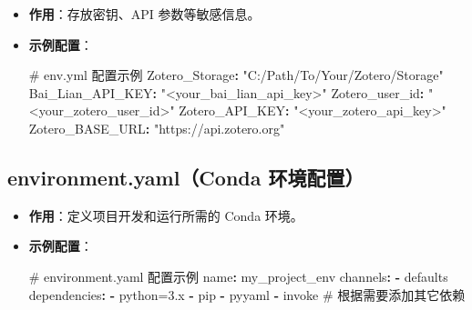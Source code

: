 \documentclass[
  letterpaper,
  DIV=11,
  numbers=noendperiod]{scrreprt}
\newenvironment{Shaded}{\begin{snugshade}}{\end{snugshade}}
\newcommand{\AttributeTok}[1]{\textcolor[rgb]{0.40,0.45,0.13}{#1}}
\newcommand{\CommentTok}[1]{\textcolor[rgb]{0.37,0.37,0.37}{#1}}
\newcommand{\FunctionTok}[1]{\textcolor[rgb]{0.28,0.35,0.67}{#1}}
\newcommand{\KeywordTok}[1]{\textcolor[rgb]{0.00,0.23,0.31}{\textbf{#1}}}
\newcommand{\StringTok}[1]{\textcolor[rgb]{0.13,0.47,0.30}{#1}}
\begin{document}
\begin{itemize}
\item
  \textbf{作用}：存放密钥、API 参数等敏感信息。\\
\item
  \textbf{示例配置}：

\begin{Shaded}
\begin{Highlighting}[]
\CommentTok{\# env.yml 配置示例}
\FunctionTok{Zotero\_Storage}\KeywordTok{:}\AttributeTok{ }\StringTok{"C:/Path/To/Your/Zotero/Storage"}
\FunctionTok{Bai\_Lian\_API\_KEY}\KeywordTok{:}\AttributeTok{ }\StringTok{"\textless{}your\_bai\_lian\_api\_key\textgreater{}"}
\FunctionTok{Zotero\_user\_id}\KeywordTok{:}\AttributeTok{ }\StringTok{"\textless{}your\_zotero\_user\_id\textgreater{}"}
\FunctionTok{Zotero\_API\_KEY}\KeywordTok{:}\AttributeTok{ }\StringTok{"\textless{}your\_zotero\_api\_key\textgreater{}"}
\FunctionTok{Zotero\_BASE\_URL}\KeywordTok{:}\AttributeTok{ }\StringTok{"https://api.zotero.org"}
\end{Highlighting}
\end{Shaded}
\end{itemize}

\subsection{environment.yaml（Conda
环境配置）}\label{environment.yamlconda-ux73afux5883ux914dux7f6e}

\begin{itemize}
\item
  \textbf{作用}：定义项目开发和运行所需的 Conda 环境。\\
\item
  \textbf{示例配置}：

\begin{Shaded}
\begin{Highlighting}[]
\CommentTok{\# environment.yaml 配置示例}
\FunctionTok{name}\KeywordTok{:}\AttributeTok{ my\_project\_env}
\FunctionTok{channels}\KeywordTok{:}
\AttributeTok{  }\KeywordTok{{-}}\AttributeTok{ defaults}
\FunctionTok{dependencies}\KeywordTok{:}
\AttributeTok{  }\KeywordTok{{-}}\AttributeTok{ python=3.x}
\AttributeTok{  }\KeywordTok{{-}}\AttributeTok{ pip}
\AttributeTok{  }\KeywordTok{{-}}\AttributeTok{ pyyaml}
\AttributeTok{  }\KeywordTok{{-}}\AttributeTok{ invoke}
\CommentTok{  \# 根据需要添加其它依赖}
\end{Highlighting}
\end{Shaded}
\end{itemize}
\end{document}
